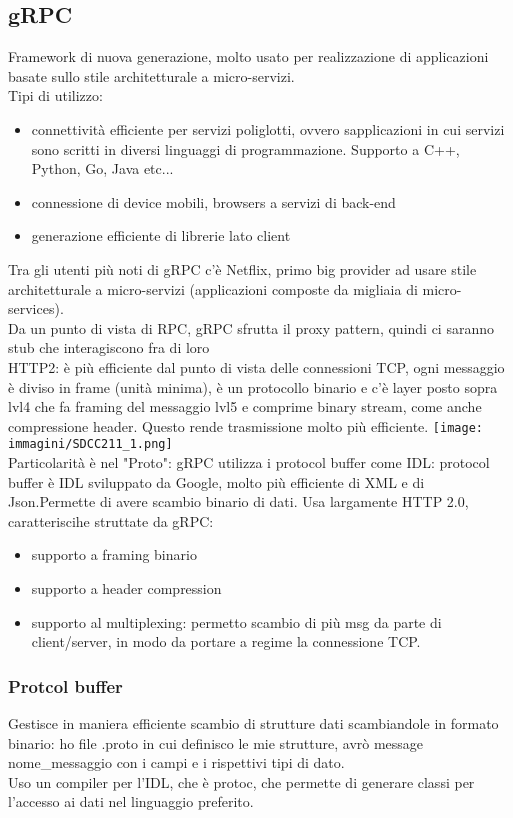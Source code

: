 \documentclass[16px]{article}
\begin{document}
\subsection{gRPC}
Framework di nuova generazione, molto usato per realizzazione di applicazioni basate sullo stile architetturale a micro-servizi.\\ Tipi di utilizzo:
\begin{itemize}
\item connettività efficiente per servizi poliglotti, ovvero sapplicazioni in cui servizi sono scritti in diversi linguaggi di programmazione. Supporto a C++, Python, Go, Java etc...
\item connessione di device mobili, browsers a servizi di back-end
\item generazione efficiente di librerie lato client
\end{itemize}
Tra gli utenti più noti di gRPC c'è Netflix, primo big provider ad usare stile architetturale a micro-servizi (applicazioni composte da migliaia di micro-services).\\ Da un punto di vista di RPC, gRPC sfrutta il proxy pattern, quindi ci saranno stub che interagiscono fra di loro\\
HTTP2: è più efficiente dal punto di vista delle connessioni TCP, ogni messaggio è diviso in frame (unità minima), è un protocollo binario e c'è layer posto sopra lvl4 che fa framing del messaggio lvl5 e comprime binary stream, come anche compressione header. Questo rende trasmissione molto più efficiente.
\texttt{[image: immagini/SDCC211\_1.png]}\\ Particolarità è nel "Proto": gRPC utilizza i protocol buffer come IDL: protocol buffer è IDL sviluppato da Google, molto più efficiente di XML e di Json.Permette di avere scambio binario di dati. Usa largamente HTTP 2.0, caratteriscihe struttate da gRPC:
\begin{itemize}
\item supporto a framing binario
\item supporto a header compression
\item supporto al multiplexing: permetto scambio di più msg da parte di client/server, in modo da portare a  regime la connessione TCP.
\end{itemize}
\subsubsection{Protcol buffer}
Gestisce in maniera efficiente scambio di strutture dati scambiandole in formato binario: ho file .proto in cui definisco le mie strutture, avrò message nome\_messaggio con i campi e i rispettivi tipi di dato.\\ Uso un compiler per l'IDL, che è protoc, che permette di generare classi per l'accesso ai dati nel linguaggio preferito.
\end{document}
